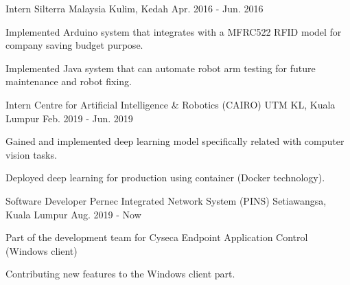 

\begin{cventries}

  \cventry
    {Intern}
    {Silterra Malaysia}
    {Kulim, Kedah}
    {Apr. 2016 - Jun. 2016}
    {
      \begin{cvitems}
        \item {Implemented Arduino system that integrates with a MFRC522 RFID model for company saving budget purpose.}
        \item {Implemented Java system that can automate robot arm testing for future maintenance and robot fixing.}
      \end{cvitems}
    }

  \cventry
    {Intern}
    {Centre for Artificial Intelligence \& Robotics (CAIRO)}
    {UTM KL, Kuala Lumpur}
    {Feb. 2019 - Jun. 2019}
    {
      \begin{cvitems}
        \item {Gained and implemented deep learning model specifically related with computer vision tasks.}
        \item {Deployed deep learning for production using container (Docker technology).}
      \end{cvitems}
    }

    \cventry
    {Software Developer}
    {Pernec Integrated Network System (PINS)}
    {Setiawangsa, Kuala Lumpur}
    {Aug. 2019 - Now}
    {
      \begin{cvitems}
        \item {Part of the development team for Cyseca Endpoint Application Control (Windows client)}
        \item {Contributing new features to the Windows client part.}
      \end{cvitems}
    }

\end{cventries}
